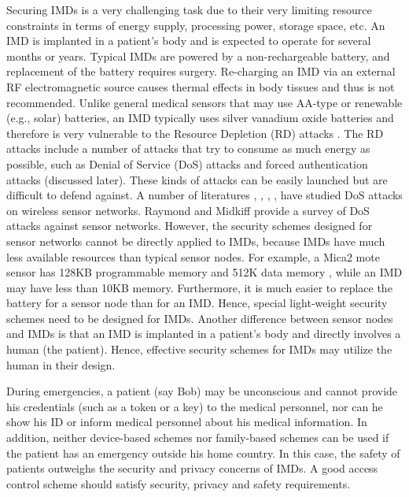 
Securing IMDs is a very challenging task due
to their very limiting resource constraints in terms of energy
supply, processing power, storage space, etc. An IMD is implanted in a patient's body and is expected to operate
for several months or years. Typical IMDs are powered by a non-rechargeable battery, and replacement of the battery requires surgery. Re-charging an IMD via an external RF electromagnetic source causes thermal effects in body tissues and thus is not recommended. Unlike general medical sensors that may use AA-type or renewable (e.g., solar) batteries, an IMD typically uses silver vanadium oxide batteries and therefore is very vulnerable to the Resource Depletion (RD) attacks
\cite{Globecom}. The RD attacks include a number of attacks that try
to consume as much energy as possible, such as Denial of Service
(DoS) attacks and forced authentication attacks (discussed later).
These kinds of attacks can be easily launched but are difficult to
defend against. A number of literatures \cite{Wang},
\cite{RFIDsecurity}, \cite{DoS}, \cite{DoS1}, \cite{DHPC} have
studied DoS attacks on wireless sensor networks. Raymond and Midkiff
\cite{DoS} provide a survey of DoS attacks against sensor networks.
However, the security schemes designed for sensor networks cannot be
directly applied to IMDs, because IMDs have much less available resources than typical sensor nodes. For example, a Mica2 mote sensor has 128KB programmable memory and 512K data memory \cite{mote}, while an IMD may have less than 10KB memory. Furthermore, it is much easier to replace the battery for a sensor node than for an IMD. Hence, special light-weight security schemes need to be designed for IMDs. Another
difference between sensor nodes and IMDs is that an IMD is implanted in a patient's body and directly involves a human (the patient). Hence, effective security schemes for IMDs may utilize the human in their design.

During emergencies, a patient (say Bob) may be unconscious and
cannot provide his credentials (such as a token or a key) to the
medical personnel, nor can he show his ID or inform medical
personnel about his medical information. In addition, neither
device-based schemes nor family-based schemes \cite{Fang} can be
used if the patient has an emergency outside his home country. In
this case, the safety of patients outweighs the security and privacy
concerns of IMDs. A good access control scheme should satisfy security, privacy and safety requirements.


%